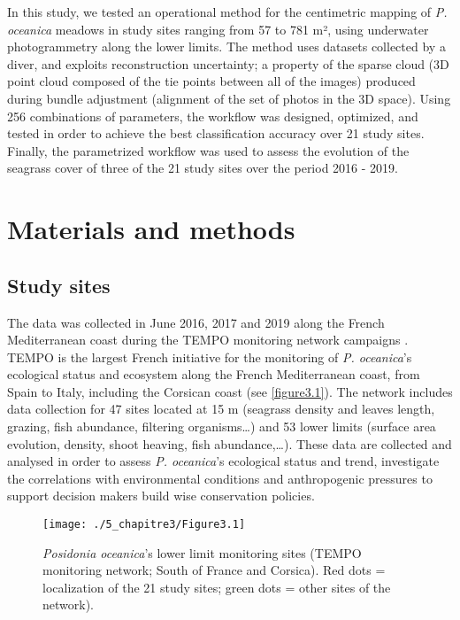 In this study, we tested an operational method for the centimetric mapping of \textit{P. oceanica} meadows in study sites ranging from 57 to 781 m², using underwater photogrammetry along the lower limits. The method uses datasets collected by a diver, and exploits reconstruction uncertainty; a property of the sparse cloud (3D point cloud composed of the tie points between all of the images) produced during bundle adjustment (alignment of the set of photos in the 3D space). Using 256 combinations of parameters, the workflow was designed, optimized, and tested in order to achieve the best classification accuracy over 21 study sites. Finally, the parametrized workflow was used to assess the evolution of the seagrass cover of three of the 21 study sites over the period 2016 - 2019.


\section{Materials and methods}\label{chapitre3_2}

\subsection{Study sites}
The data was collected in June 2016, 2017 and 2019 along the French Mediterranean coast during the TEMPO monitoring network campaigns \citep{andromede-oceanologie_tempo_2020}. TEMPO is the largest French initiative for the monitoring of \textit{P. oceanica}’s ecological status and ecosystem along the French Mediterranean coast, from Spain to Italy, including the Corsican coast (see \autoref{figure3.1}). The network includes data collection for 47 sites located at 15 m (seagrass density and leaves length, grazing, fish abundance, filtering organisms…) and 53 lower limits (surface area evolution, density, shoot heaving, fish abundance,…). These data are collected and analysed in order to assess \textit{P. oceanica}’s ecological status and trend, investigate the correlations with environmental conditions and anthropogenic pressures to support decision makers build wise conservation policies.


\begin{figure}[H]
	\begin{center}
	\texttt{[image: ./5\_chapitre3/Figure3.1]}
		\caption[\textit{Posidonia oceanica}’s lower limit monitoring sites.]{\textit{Posidonia oceanica}’s lower limit monitoring sites (TEMPO monitoring network; South of France and Corsica). Red dots = localization of the 21 study sites; green dots = other sites of the network).}
	\label{figure3.1}
\end{center}
\end{figure}


